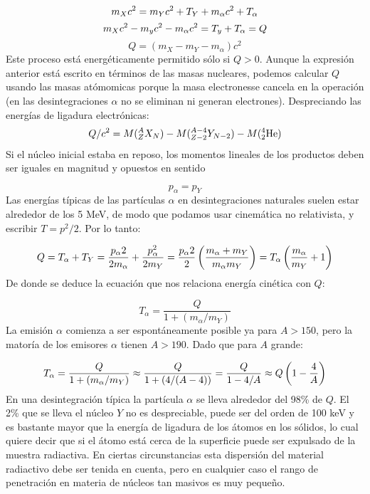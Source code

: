 \begin{equation}
    m_X c^2 = m_Y c^2 + T_Y + m_\alpha c^2 + T_\alpha \\
\end{equation}    
\begin{equation}
    m_X c^2 - m_y c^2 - m_\alpha  c^2  = T_y + T_\alpha = Q \\
\end{equation}    
\begin{equation}
    Q = (m_X - m_Y - m_\alpha)c^2
\end{equation}    
Este proceso está energéticamente permitido sólo si $Q>0$. Aunque la expresión anterior está escrito en términos de las masas nucleares, podemos calcular $Q$ usando las masas atómomicas porque la masa electronesse cancela en la operación (en las desintegraciones $\alpha$ no se eliminan ni generan electrones). Despreciando las energías de ligadura electrónicas:
\begin{eqnarray}
Q/c^2 = M(^A_Z X_N) - M(^{A-4}_{Z-2}Y_{N-2}) - M(^4_2\text{He})
\end{eqnarray}
Si el núcleo inicial estaba en reposo, los momentos lineales de los productos deben ser iguales en magnitud y opuestos en sentido

\begin{equation}
    p_\alpha = p_Y
\end{equation}
Las energías típicas de las partículas $\alpha$ en desintegraciones naturales suelen estar alrededor de los 5 MeV, de modo que podamos usar cinemática no relativista, y escribir $T=p^2/2$. Por lo tanto:

\begin{equation}
	Q=T_\alpha + T_Y = \frac{p_\alpha2}{2m_\alpha} + \frac{p^2_\alpha}{2m_Y} = \frac{p_\alpha2}{2} \left( \frac{m_\alpha + m_Y}{m_\alpha m_Y} \right) = T_\alpha \left( \frac{m_\alpha}{m_Y} + 1  \right) 
\end{equation}	
De donde se deduce la ecuación que nos relaciona energía cinética con $Q$:

\begin{equation}
	T_\alpha = \frac{Q}{1+(m_\alpha/m_Y)}
\end{equation}
La emisión $\alpha$ comienza a ser espontáneamente posible ya para $A>150$, pero la matoría de los emisores $\alpha$ tienen $A>190$. Dado que para $A$ grande:

\begin{equation}
	T_\alpha = \frac{Q}{1+(m_\alpha/m_Y)} \approx \frac{Q}{1+(4/(A-4))}= \frac{Q}{1-4/A} \approx Q \left( 1-\frac{4}{A} \right)
\end{equation}
En una desintegración típica la partícula $\alpha$ se lleva alrededor del 98\% de $Q$. El 2\% que se lleva el núcleo $Y$ no es despreciable, puede ser del orden de 100 keV y es bastante mayor que la energía de ligadura de los átomos en los sólidos, lo cual quiere decir que si el átomo está cerca de la superficie puede ser expulsado de la muestra radiactiva. En ciertas circunstancias esta dispersión del material radiactivo debe ser tenida en cuenta, pero en cualquier caso el rango de penetración en materia de núcleos tan masivos es muy pequeño. 

